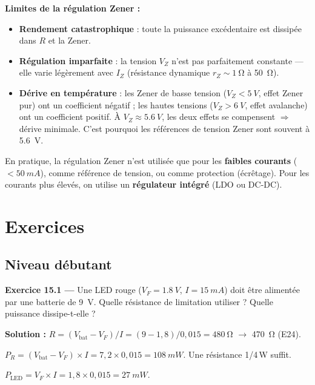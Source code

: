\documentclass[12pt,a4paper,twoside]{book}
\begin{document}
\begin{attention}
\textbf{Limites de la régulation Zener :}
\begin{itemize}[nosep]
\item \textbf{Rendement catastrophique} : toute la puissance excédentaire est dissipée dans $R$ et la Zener.
\item \textbf{Régulation imparfaite} : la tension $V_Z$ n'est pas parfaitement constante --- elle varie légèrement avec $I_Z$ (résistance dynamique $r_Z \sim \SI{1}{\ohm}$ à \SI{50}{\ohm}).
\item \textbf{Dérive en température} : les Zener de basse tension ($V_Z < \SI{5}{V}$, effet Zener pur) ont un coefficient négatif ; les hautes tensions ($V_Z > \SI{6}{V}$, effet avalanche) ont un coefficient positif. À $V_Z \approx \SI{5.6}{V}$, les deux effets se compensent $\Rightarrow$ dérive minimale. C'est pourquoi les références de tension Zener sont souvent à \SI{5.6}{V}.
\end{itemize}
En pratique, la régulation Zener n'est utilisée que pour les \textbf{faibles courants} ($< \SI{50}{mA}$), comme référence de tension, ou comme protection (écrêtage). Pour les courants plus élevés, on utilise un \textbf{régulateur intégré} (LDO ou DC-DC).
\end{attention}

\section*{Exercices}

\subsection*{Niveau débutant}

\textbf{Exercice 15.1 ---} Une LED rouge ($V_F = \SI{1.8}{V}$, $I = \SI{15}{mA}$) doit être alimentée par une batterie de \SI{9}{V}. Quelle résistance de limitation utiliser ? Quelle puissance dissipe-t-elle ?

\begin{pratique}
\textbf{Solution :} $R = (V_{\text{bat}} - V_F)/I = (9 - 1{,}8)/0{,}015 = \SI{480}{\ohm}$ $\to$ \SI{470}{\ohm} (E24).

$P_R = (V_{\text{bat}} - V_F) \times I = 7{,}2 \times 0{,}015 = \SI{108}{mW}$. Une résistance 1/4\,W suffit.

$P_{\text{LED}} = V_F \times I = 1{,}8 \times 0{,}015 = \SI{27}{mW}$.
\end{pratique}
\end{document}
